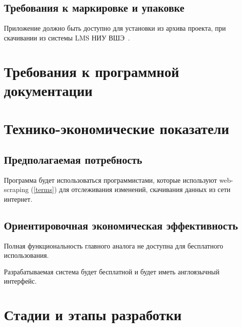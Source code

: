 \documentclass[a4paper,12pt,reqno]{article}
\begin{document}
	
	\subsection{Требования к маркировке и упаковке}
	Приложение должно быть доступно для установки из архива проекта, при скачивании из системы LMS НИУ ВШЭ~\cite{lms}.
	
						\newpage
	\section{Требования к программной документации}
    
	
						\newpage
	\section{Технико-экономические показатели}
	\subsection{Предполагаемая потребность}
	Программа будет использоваться программистами, которые используют web-scraping (\ref{terms}) для отслеживания изменений, скачивания данных из сети интернет. 
	
	\subsection{Ориентировочная экономическая эффективность} 
	Полная функциональность главного аналога \cite{scrapinghub} не доступна для бесплатного использования. 
	
	Разрабатываемая система будет бесплатной и будет иметь англоязычный интерфейс.
	
						\newpage
	\section{Стадии и этапы разработки}
	
\end{document}
